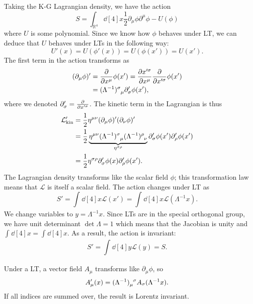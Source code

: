 \begin{example}
Taking the K-G Lagrangian density, we have the action
\begin{equation}
  S = \int_{\mathbb{R}^4}^{} \dd[4]{x} \frac{1}{2} \partial_\mu \phi \partial^\mu \phi - U(\phi)
\end{equation}
where $U$ is some polynomial.
Since we know how $\phi$ behaves under LT, we can deduce that $U$ behaves under LTs in the following way:
\begin{equation}
  U'(x) = U(\phi'(x)) = U(\phi(x')) = U(x').
\end{equation}
The first term in the action transforms as
\begin{align}
  ( \partial_\mu \phi )' &= \pdv{}{x^\mu}\phi(x') = \pdv{x'^\sigma}{x^\mu} \pdv{}{x'^\sigma} \phi(x') \\
  &= (\Lambda^{-1})\indices{^\sigma_\mu} \partial_\sigma' \phi(x'),
\end{align}
where we denoted $\partial_\sigma' = \pdv{}{x'^\sigma}$.
The kinetic term in the Lagrangian is thus
\begin{align}
  \mathcal{L}'_{\text{kin}} &= \frac{1}{2} \eta\indices{^\mu^\nu} (\partial_\mu \phi)' (\partial_\nu \phi)' \\
  &= \frac{1}{2} \underbrace{\eta\indices{^\mu^\nu}(\Lambda^{-1})\indices{^\sigma_\mu} (\Lambda^{-1})\indices{^\rho_\nu} }_{\eta\indices{^\sigma^\rho}} \partial_\sigma' \phi(x') \partial_\rho' \phi(x') \\
  &= \frac{1}{2} \eta\indices{^\sigma^\rho} \partial_\sigma' \phi(x) \partial_\rho' \phi(x').
\end{align}
The Lagrangian density transforms like the scalar field $\phi$; this transformation law means that $\mathcal{L}$ is itself a scalar field.
The action changes under LT as
\begin{equation}
  S' = \int_{}^{} \dd[4]{x} \mathcal{L}(x') = \int_{}^{} \dd[4]{x} \mathcal{L} (\Lambda^{-1}x).
\end{equation}
  We change variables to $y = \Lambda^{-1} x$. Since LTs are in the special orthogonal group, we have unit determinant $\det \Lambda = 1$ which means that the Jacobian is unity and $\int_{}^{} \dd[4]{x}  = \int_{}^{} \dd[4]{x}$. As a result, the action is invariant:
  \begin{equation}
    S' = \int_{}^{} \dd[4]{y} \mathcal{L}(y) = S.
  \end{equation}
\end{example} 

\begin{leftbar}
  \begin{remark}
    Under a LT, a vector field $A_\mu$ transforms like $\partial_\mu \phi$, so
    \begin{equation}
      A_\mu'(x) = (\Lambda^{-1})\indices{_\mu^\sigma} A_\sigma(\Lambda^{-1} x).
    \end{equation}
    If all indices are summed over, the result is Lorentz invariant.
  \end{remark}
\end{leftbar}


